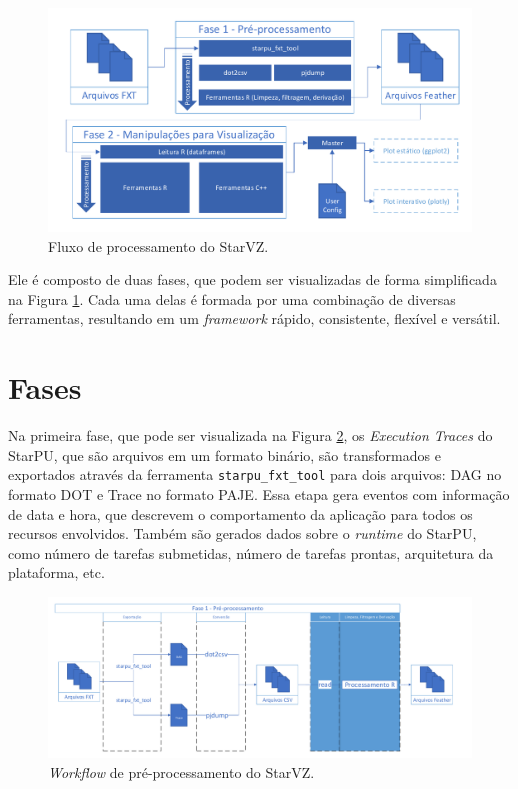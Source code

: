 \begin{figure}[ht]
 \centerline{\includegraphics[width=1\textwidth]{./img/all-proc.pdf}}
 \caption{Fluxo de processamento do StarVZ.}
 \label{fig:starvz-workflow-general}
\end{figure}

Ele é composto de duas fases, que podem ser visualizadas de forma simplificada na Figura \ref{fig:starvz-workflow-general}.
Cada uma delas é formada por uma combinação de diversas ferramentas, resultando em um 
\emph{framework} rápido, consistente, flexível e versátil.



\section{Fases}\label{sect:starvz-phases}

Na primeira fase, que pode ser visualizada na Figura \ref{fig:starvz-workflow1}, os 
\emph{Execution Traces} do StarPU, que são arquivos em um formato binário, são 
transformados e exportados através da ferramenta \texttt{starpu\_fxt\_tool} para dois 
arquivos: DAG no formato DOT e Trace no formato PAJE. Essa etapa gera eventos com informação de data e hora, 
que descrevem o comportamento da aplicação para todos os recursos envolvidos. 
Também são gerados dados sobre o \emph{runtime} do StarPU, como número de tarefas submetidas,
número de tarefas prontas, arquitetura da plataforma, etc.

\begin{figure}[ht]
 \centerline{\includegraphics[width=1\textwidth]{./img/step1-simpler.pdf}}
 \caption{\emph{Workflow} de pré-processamento do StarVZ.}
 \label{fig:starvz-workflow1}
\end{figure}

